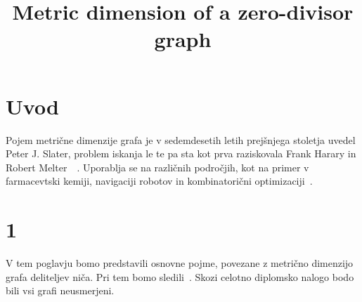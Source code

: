 \documentclass[mat1, tisk]{fmfdelo}
\title{Metric dimension of a zero-divisor graph}
\begin{document}
\section{Uvod}


Pojem metrične dimenzije grafa je v sedemdesetih letih prejšnjega stoletja 
uvedel Peter J. Slater, problem iskanja le te pa sta kot prva raziskovala 
Frank Harary in Robert Melter~\cite{7dolzan}~\cite{4pirzada17}. Uporablja se 
na različnih področjih, kot na primer v farmacevtski kemiji, navigaciji 
robotov in kombinatorični optimizaciji~\cite{0OuSh}.
%
%
\section{1}
V tem poglavju bomo predstavili osnovne pojme, povezane z metrično dimenzijo grafa 
deliteljev niča. Pri tem bomo sledili~\cite{0OuSh}. Skozi celotno diplomsko nalogo 
bodo bili vsi grafi neusmerjeni.
%
\end{document}
